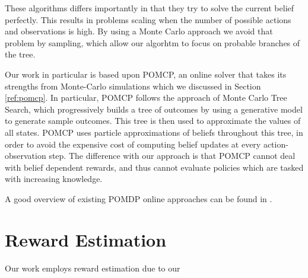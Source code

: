 These algorithms differs importantly in that they try to solve the current belief perfectly. This
results in problems scaling when the number of possible actions and observations is high. By using
a Monte Carlo approach we avoid that problem by sampling, which allow our algorhtm to focus on
probable branches of the tree.

%

Our work in particular is based upon POMCP, an online solver that takes its strengths from
Monte-Carlo simulations \cite{cit:pomcp} which we discussed in Section \ref{ref:pomcp}. In
particular, POMCP follows the approach of Monte Carlo Tree Search, which progressively builds a tree
of outcomes by using a generative model to generate sample outcomes. This tree is then used to
approximate the values of all states. POMCP uses particle approximations of beliefs throughout this
tree, in order to avoid the expensive cost of computing belief updates at every action-observation
step. The difference with our approach is that POMCP cannot deal with belief dependent rewards, and
thus cannot evaluate policies which are tasked with increasing knowledge.

A good overview of existing POMDP online approaches can be found in \cite{cit:relworkonlineall}.

\section{Reward Estimation}

Our work employs reward estimation due to our
